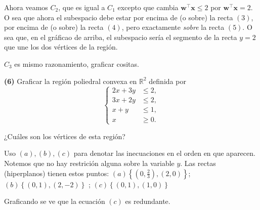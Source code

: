 \documentclass[12pt]{article}
\begin{document}
Ahora veamos $C_2$, que es igual a $C_1$ excepto que cambia
$\textbf{w}^\top\textbf{x} \leq 2$ por $\textbf{w}^\top \textbf{x} = 2$. O sea
que ahora el subespacio debe estar por encima de (o sobre) la recta $(3)$, por
encima de (o sobre) la recta $(4)$, pero exactamente \textit{sobre} la recta
$(5)$. O sea que, en el gráficao de arriba, el subespacio sería el segmento de
la recta $y = 2$ que une los dos vértices de la región.

$C_3$ es mismo razonamiento, graficar cositas. 



\pagebreak 

\begin{myframe}

\textbf{(6)} Graficar la región poliedral convexa en $\mathbb{R}^2$ definida por
\[
\left\{
\begin{aligned}
2x + 3y &\le 2,\\
3x + 2y &\le 2,\\
x + y &\le 1,\\
x &\ge 0.
\end{aligned}
\right.
\]

¿Cuáles son los vértices de esta región?
\end{myframe}

Uso $(a), (b), (c)$ para denotar las inecuaciones en el orden en que aparecen.
Notemos que no hay restrición alguna sobre la variable $y$. Las rectas
(hiperplanos) tienen estos puntos: $(a) \left\{ (0, \frac{2}{3}), (2, 0)
\right\} $; $(b) \left\{ (0, 1), (2, -2) \right\} $ ; $(c) \left\{ (0, 1), (1, 0) \right\} $




Graficando se ve que
la ecuación $(c)$ es redundante.
\end{document}
